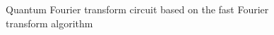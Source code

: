 \begin{figure}
\centering



\caption{Quantum Fourier transform circuit based on the fast Fourier transform algorithm}
\label{figQuantCompQuantFourier}
\end{figure}
